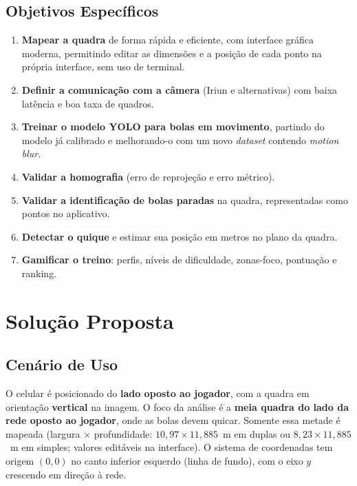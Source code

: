 \documentclass[a4paper,11pt]{article}
\begin{document}
\subsection{Objetivos Específicos}
\begin{enumerate}[label=\textbf{OE\arabic*.}]
  \item \textbf{Mapear a quadra} de forma rápida e eficiente, com interface gráfica moderna, permitindo editar as dimensões e a posição de cada ponto na própria interface, sem uso de terminal.
  \item \textbf{Definir a comunicação com a câmera} (Iriun e alternativas) com baixa latência e boa taxa de quadros.
  \item \textbf{Treinar o modelo YOLO para bolas em movimento}, partindo do modelo já calibrado e melhorando-o com um novo \textit{dataset} contendo \textit{motion blur}.
  \item \textbf{Validar a homografia} (erro de reprojeção e erro métrico).
  \item \textbf{Validar a identificação de bolas paradas} na quadra, representadas como pontos no aplicativo.
  \item \textbf{Detectar o quique} e estimar sua posição em metros no plano da quadra.
  \item \textbf{Gamificar o treino}: perfis, níveis de dificuldade, zonas-foco, pontuação e ranking.
\end{enumerate}

\section{Solução Proposta}

\subsection{Cenário de Uso}
O celular é posicionado do \textbf{lado oposto ao jogador}, com a quadra em orientação \textbf{vertical} na imagem. O foco da análise é a \textbf{meia quadra do lado da rede oposto ao jogador}, onde as bolas devem quicar. Somente essa metade é mapeada (largura $\times$ profundidade: $10{,}97 \times 11{,}885$~m em duplas ou $8{,}23 \times 11{,}885$~m em simples; valores editáveis na interface). O sistema de coordenadas tem origem $(0,0)$ no canto inferior esquerdo (linha de fundo), com o eixo $y$ crescendo em direção à rede.
\end{document}
